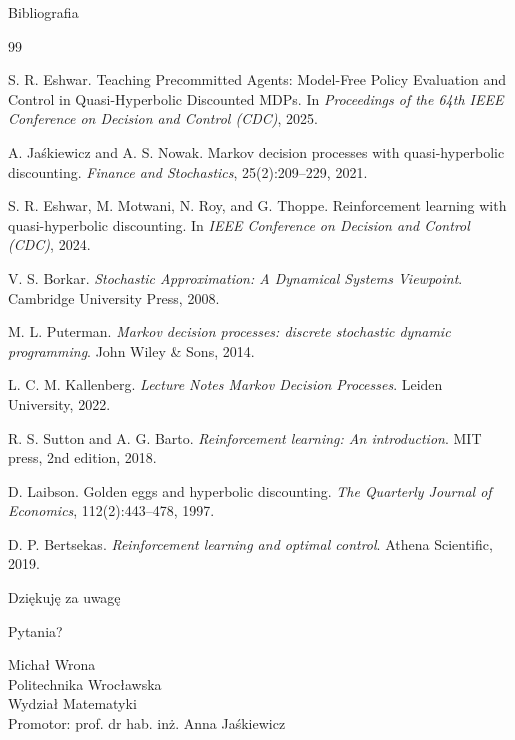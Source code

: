 \begin{frame}[allowframebreaks]{Bibliografia}
\small
\begin{thebibliography}{99}

S. R. Eshwar.
\newblock Teaching Precommitted Agents: Model-Free Policy Evaluation and Control in Quasi-Hyperbolic Discounted MDPs.
\newblock In \emph{Proceedings of the 64th IEEE Conference on Decision and Control (CDC)}, 2025.

A. Jaśkiewicz and A. S. Nowak.
\newblock Markov decision processes with quasi-hyperbolic discounting.
\newblock \emph{Finance and Stochastics}, 25(2):209--229, 2021.

S. R. Eshwar, M. Motwani, N. Roy, and G. Thoppe.
\newblock Reinforcement learning with quasi-hyperbolic discounting.
\newblock In \emph{IEEE Conference on Decision and Control (CDC)}, 2024.

V. S. Borkar.
\newblock \emph{Stochastic Approximation: A Dynamical Systems Viewpoint}.
\newblock Cambridge University Press, 2008.

M. L. Puterman.
\newblock \emph{Markov decision processes: discrete stochastic dynamic programming}.
\newblock John Wiley \& Sons, 2014.

L. C. M. Kallenberg.
\newblock \emph{Lecture Notes Markov Decision Processes}.
\newblock Leiden University, 2022.

R. S. Sutton and A. G. Barto.
\newblock \emph{Reinforcement learning: An introduction}.
\newblock MIT press, 2nd edition, 2018.

D. Laibson.
\newblock Golden eggs and hyperbolic discounting.
\newblock \emph{The Quarterly Journal of Economics}, 112(2):443--478, 1997.

D. P. Bertsekas.
\newblock \emph{Reinforcement learning and optimal control}.
\newblock Athena Scientific, 2019.

\end{thebibliography}
\end{frame}

\begin{frame}[plain]
\begin{center}
{\Huge Dziękuję za uwagę}

\vspace{2em}
{\Large Pytania?}

\vspace{3em}
\normalsize
Michał Wrona\\
Politechnika Wrocławska\\
Wydział Matematyki\\[0.5em]
Promotor: prof. dr hab. inż. Anna Jaśkiewicz
\end{center}
\end{frame}
